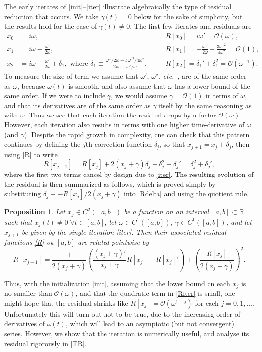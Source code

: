 \documentclass[10pt]{article}
\newcommand{\be}{\begin{equation}}
\newcommand{\ee}{\end{equation}}
\newcommand{\etc}{{\it etc.\ }}
\newcommand{\R}{\mathbb{R}}
\newcommand{\bigO}{{\mathcal O}}
\newtheorem{pro}[thm]{Proposition}
\newcommand{\om}{\omega}
\newcommand{\g}{\gamma}
\begin{document}
{The early iterates of \cref{init}--\cref{iter} illustrate
algebraically
the type of residual reduction that occurs. We take $\g(t) = 0$ below for the
sake of simplicity, but the results hold for the case of $\g(t) \neq 0$. The first few iterates and residuals are
\begin{align}
    x_0 &=  i\om, &&R[x_0] = i\om' = \bigO(\om), \nonumber \\
x_1 &= i\om - \frac{\om'}{2\om}, 
    &&R[x_1] = -\frac{\om''}{2\om} + \frac{3\om'^2}{4\om^2} = \bigO(1), \nonumber \\
x_2 &= i\om - \frac{\om'}{2\om} + \delta_1, \mbox{ where }
    \delta_1 \equiv \frac{\om''/2\om - 3\om'^2/4\om^2}{2i\om - \om'/\om}, \quad
    &&R[x_2] = \delta_1' + \delta_1^2 = \bigO(\om^{-1}). \nonumber
\end{align}
To measure the size of term we assume that $\om'$, $\om''$, \etc, are
of the same order as $\om$, because $\om(t)$ is smooth,
and also assume that $\om$ has a lower bound of the same order. If we were to include $\g$, we would assume $\g = \bigO(1) $ in terms of $\om$, and that its derivatives are of the same order as $\g$ itself by the same reasoning as with $\om$. 
Thus we see that each iteration the residual drops by a factor $\bigO(\om)$.
However, each iteration also results in terms with
one higher time-derivative of $\om$ (and $\g$).
Despite the rapid growth in complexity, one can check that this
pattern continues
by defining the $j$th correction function $\delta_j$,
so that $x_{j+1} = x_j + \delta_j$, then using \cref{R} to write
\be
R[x_{j+1}] = R[x_j] + 2\left(x_j + \g \right)\delta_j  + \delta_j^2 + \delta_j' = \delta_j^2 + \delta_j',
\label{Rdelta}
\ee
where the first two terms cancel by design due to \cref{iter}.
The resulting evolution of the residual is then
summarized as follows, which is proved simply by
substituting $\delta_j \equiv -R[x_j]/2(x_j + \g)$ into \cref{Rdelta} and using
the quotient rule.
\begin{pro}\label{PRiter}
  Let $x_j \in C^2([a,b])$ be a function on an interval $[a,b]\subset \R$
  such that $x_j(t) \neq 0 \; \forall t\in [a,b]$,
  let $\om\in C^1([a,b])$,
  $\g\in C^1([a,b])$,
  and let $x_{j+1}$ be given by the single iteration \cref{iter}.
  Then their associated residual functions \cref{R} on $[a,b]$
  are related pointwise by
  \be
  \label{Riter}
    R[x_{j+1}] = \frac{1}{2(x_j + \g)}\left( \frac{(x_j + \g)'}{x_j + \g} R[x_j] - R[x_j]' \right) 
    + \left(\frac{R[x_j]}{2(x_j + \g)}\right)^2. 
  \ee
\end{pro}
Thus, with the initialization \cref{init},
assuming that the lower bound on each $x_j$ is no smaller than $\bigO(\om)$,
and that the quadratic term in \cref{Riter} is small,
one might hope that
the residual shrinks like $R[x_j] = \bigO(\om^{1-j})$ for each $j=0,1,\dots$.
Unfortunately this will turn out not to be true, due to the increasing
order of derivatives of $\om(t)$, which will lead to an
asymptotic (but not convergent) series.
However, we show that the iteration is numerically useful,
and analyse its residual rigorously in \cref{TR}.
}
\end{document}
